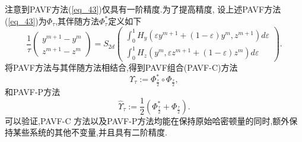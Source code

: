 注意到PAVF方法(\ref{eq_43})仅具有一阶精度\cite{caiPartitionedAveragedVector2018}.为了提高精度,
设上述PAVF方法(\ref{eq_43})为$\Phi_{\tau}$,其伴随方法$\Phi_{\tau}^{*}$定义如下
\begin{equation}
\frac{1}{\tau}\left(\begin{array}{c}
y^{m+1}-y^{m} \\
z^{m+1}-z^{m}
\end{array}\right)=S_{2 d}\left(\begin{array}{c}
\int_{0}^{1} H_{y}\left(\varepsilon y^{m+1}+(1-\varepsilon) y^{m}, z^{m+1}\right) d \varepsilon \\
\int_{0}^{1} H_{z}\left(y^{m}, \varepsilon z^{m+1}+(1-\varepsilon) z^{m}\right) d \varepsilon
\end{array}\right).
\label{eq_44}\end{equation}
将PAVF方法与其伴随方法相结合,得到PAVF组合(PAVF-C)方法
\begin{equation}
\Upsilon_{\tau}:=\Phi_{\frac{\tau}{2}}^{*} \circ \Phi_{\frac{\tau}{2}},
\label{eq_45}\end{equation}
和PAVF-P方法
\begin{equation}
\hat{\Upsilon}_{\tau}:=\frac{1}{2}\left(\Phi_{\frac{\tau}{2}}^{*}+\Phi_{\frac{\tau}{2}}\right).
\label{eq_46}\end{equation}
可以验证,PAVF-C 方法以及PAVF-P方法均能在保持原始哈密顿量的同时,额外保持某些系统的其他不变量,并且具有二阶精度\cite{caiPartitionedAveragedVector2018}.

